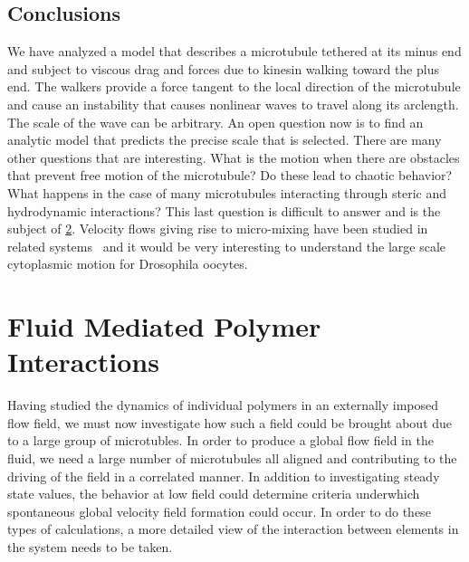 \documentclass[11pt]{ucthesis}
\begin{document}
\section{Conclusions}

We have analyzed a model that describes a microtubule tethered at its minus
end and subject to viscous drag and forces due to kinesin walking toward the plus end. The walkers
provide a force tangent to the local direction of the microtubule and
cause an instability that causes nonlinear waves to travel along its
arclength. The scale of the wave can be arbitrary. An open question now 
is to find an analytic model that predicts the precise scale that
is selected. There are many other questions that are interesting.
What is the motion when there are obstacles that prevent free motion
of the microtubule? Do these lead to chaotic behavior? What happens
in the case of many microtubules interacting through steric and hydrodynamic
interactions? This last question is difficult to answer and is the subject of \ref{chap:Interact}. Velocity
flows giving rise to micro-mixing have been studied in related systems~\cite{GoldsteinTuvalvandeMeentPNAS,GoldsteinTuvalvandeMeentPRL,MeentSedermanGladdenGoldstein,VerchotLubiczGoldstein} and it would be very interesting to
understand the large scale cytoplasmic motion for Drosophila oocytes.







\chapter{Fluid Mediated Polymer Interactions}
\label{chap:Interact}
Having studied the dynamics of individual polymers in an externally imposed flow field, we must now investigate how such a field could be brought about due to a large group of microtubles. 
In order to produce a global flow field in the fluid, we need a large number of microtubules all aligned and contributing to the driving of the field in a correlated manner. 
In addition to investigating steady state values, the behavior at low field could determine criteria underwhich spontaneous global velocity field formation could occur. In order to do these types of calculations, a more detailed view of the interaction between elements in the system needs to be taken.
\end{document}
